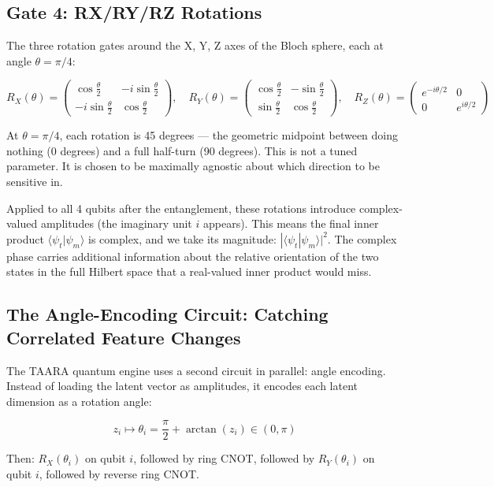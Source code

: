 \documentclass[11pt,a4paper]{article}
\newcommand{\braket}[2]{\langle #1|#2\rangle}
\begin{document}
\subsection{Gate 4: RX/RY/RZ Rotations}

The three rotation gates around the X, Y, Z axes of the Bloch sphere, each at angle $\theta = \pi/4$:

\[
R_X(\theta) = \begin{pmatrix} \cos\frac{\theta}{2} & -i\sin\frac{\theta}{2} \\ -i\sin\frac{\theta}{2} & \cos\frac{\theta}{2} \end{pmatrix}, \quad
R_Y(\theta) = \begin{pmatrix} \cos\frac{\theta}{2} & -\sin\frac{\theta}{2} \\ \sin\frac{\theta}{2} & \cos\frac{\theta}{2} \end{pmatrix}, \quad
R_Z(\theta) = \begin{pmatrix} e^{-i\theta/2} & 0 \\ 0 & e^{i\theta/2} \end{pmatrix}
\]

At $\theta = \pi/4$, each rotation is 45 degrees — the geometric midpoint between doing nothing (0 degrees) and a full half-turn (90 degrees). This is not a tuned parameter. It is chosen to be maximally agnostic about which direction to be sensitive in.

Applied to all 4 qubits after the entanglement, these rotations introduce complex-valued amplitudes (the imaginary unit $i$ appears). This means the final inner product $\braket{\psi_t}{\psi_m}$ is complex, and we take its magnitude: $|\braket{\psi_t}{\psi_m}|^2$. The complex phase carries additional information about the relative orientation of the two states in the full Hilbert space that a real-valued inner product would miss.

\subsection{The Angle-Encoding Circuit: Catching Correlated Feature Changes}

The TAARA quantum engine uses a second circuit in parallel: angle encoding. Instead of loading the latent vector as amplitudes, it encodes each latent dimension as a rotation angle:

\[
z_i \mapsto \theta_i = \frac{\pi}{2} + \arctan(z_i) \in (0, \pi)
\]

Then: $R_X(\theta_i)$ on qubit $i$, followed by ring CNOT, followed by $R_Y(\theta_i)$ on qubit $i$, followed by reverse ring CNOT.
\end{document}
